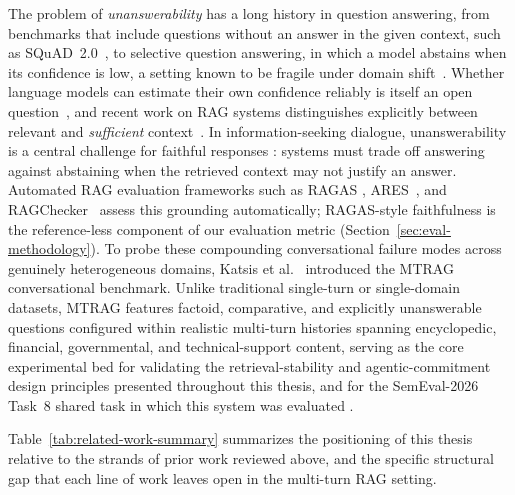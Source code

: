 The problem of \textit{unanswerability} has a long history in question answering, from benchmarks that include questions without an answer in the given context, such as SQuAD~2.0~\citep{rajpurkar2018squad2}, to selective question answering, in which a model abstains when its confidence is low, a setting known to be fragile under domain shift~\citep{kamath2020selective}. Whether language models can estimate their own confidence reliably is itself an open question~\citep{kadavath2022language}, and recent work on RAG systems distinguishes explicitly between relevant and \emph{sufficient} context~\citep{joren2025sufficient}. In information-seeking dialogue, unanswerability is a central challenge for faithful responses \citep{dziri2022faithdial}: systems must trade off answering against abstaining when the retrieved context may not justify an answer. Automated RAG evaluation frameworks such as RAGAS \citep{es2024ragas}, ARES~\citep{saadfalcon2024ares}, and RAGChecker~\citep{ru2024ragchecker} assess this grounding automatically; RAGAS-style faithfulness is the reference-less component of our evaluation metric (Section~\ref{sec:eval-methodology}). To probe these compounding conversational failure modes across genuinely heterogeneous domains, Katsis et al.\ \citep{katsis2025mtrag} introduced the MTRAG conversational benchmark. Unlike traditional single-turn or single-domain datasets, MTRAG features factoid, comparative, and explicitly unanswerable questions configured within realistic multi-turn histories spanning encyclopedic, financial, governmental, and technical-support content, serving as the core experimental bed for validating the retrieval-stability and agentic-commitment design principles presented throughout this thesis, and for the SemEval-2026 Task~8 shared task in which this system was evaluated \citep{rosenthal2026semeval}.

Table~\ref{tab:related-work-summary} summarizes the positioning of this thesis relative to the strands of prior work reviewed above, and the specific structural gap that each line of work leaves open in the multi-turn RAG setting.

